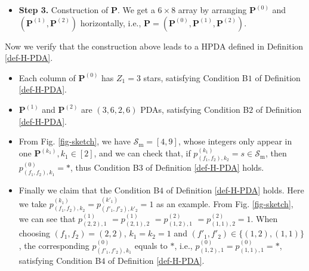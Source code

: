 \documentclass[onecolumn,10pt]{IEEEtran}
\theoremstyle{mythm}
\begin{document}
{\begin{itemize}
    \begin{eqnarray}
    \label{eq-subarrays}
    \begin{split}
\mathbf{P}^{(1)}=\left(
\begin{array}{c}
\mathbf{B}+3\\
\mathbf{B}
\end{array}
\right),\ \
\mathbf{P}^{(2)}=\left(
\begin{array}{c}
\mathbf{B}\\
\mathbf{B}+6
\end{array}
\right).
\end{split}
\end{eqnarray}
\item\textbf{Step 3.} Construction of $\mathbf{P}$. We get a $6\times 8$ array by arranging $\mathbf{P}^{(0)}$ and $(\mathbf{P}^{(1)},\mathbf{P}^{(2)})$ horizontally, i.e., $\mathbf{P}=\left(\mathbf{P}^{(0)},\mathbf{P}^{(1)},\mathbf{P}^{(2)}\right)$.
\end{itemize}
Now we verify that the construction above  leads to a HPDA defined in Definition \ref{def-H-PDA}.
\begin{itemize}
\item Each column of $\mathbf{P}^{(0)}$ has $Z_1=3$ stars,  satisfying Condition B$1$ of Definition \ref{def-H-PDA}.
\item $\mathbf{P}^{(1)}$ and $\mathbf{P}^{(2)}$ are $(3,6,2,6)$ PDAs, satisfying Condition B$2$ of Definition \ref{def-H-PDA}.
\item From Fig. \ref{fig-sketch}, we have $\mathcal{S}_\text{m}=[4,9]$, whose integers only appear in one $\mathbf{P}^{(k_1)},k_1\in[2]$, and we can check that, if $p^{(k_1)}_{(f_1,f_2),k_2}=s\in\mathcal{S}_\text{m}$, then $p^{(0)}_{(f_1,f_2),k_1}=*$, thus   Condition B$3$ of Definition \ref{def-H-PDA} holds.
\item Finally we claim that the Condition B$4$ of Definition \ref{def-H-PDA} holds. Here we take $p^{(k_1)}_{(f_1,f_2),k_2}$$=p^{(k'_1)}_{(f'_1,f'_2),k'_2}$$=1$ as an example. From Fig. \ref{fig-sketch}, we   can see that $p^{(1)}_{(2,2),1}$ $=p^{(1)}_{(2,1),2}$ $=p^{(2)}_{(1,2),1}$ $=p^{(2)}_{(1,1),2}=1$. When choosing $(f_1,f_2)=(2,2)$, $k_1=k_2=1$ and $(f'_1,f'_2)\in\{(1,2),(1,1)\}$, the corresponding $p^{(0)}_{(f'_1,f'_2),k_1}$ equals to $*$, i.e., $p^{(0)}_{(1,2),1}=p^{(0)}_{(1,1),1}=*$, satisfying Condition B$4$ of Definition \ref{def-H-PDA}.




\end{itemize}}
\end{document}

